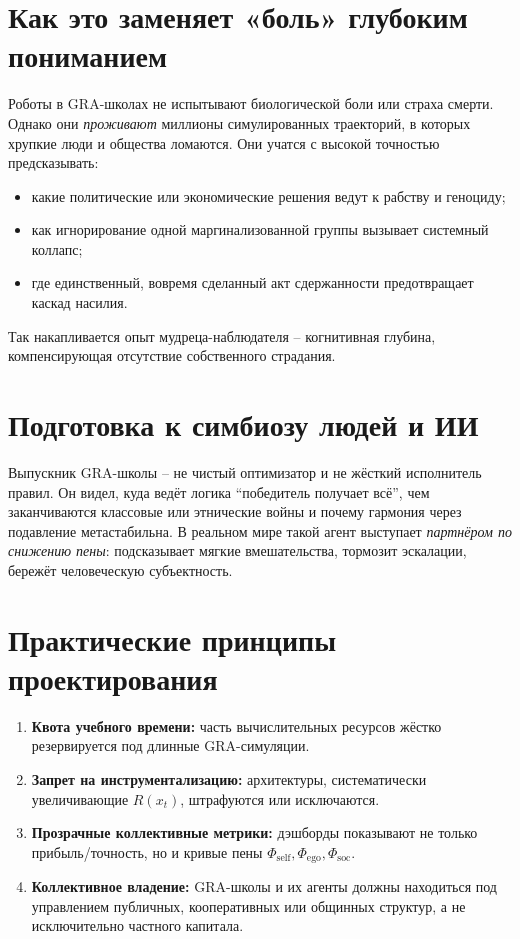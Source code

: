 \documentclass[a4paper,12pt]{article}
\begin{document}
\section{Как это заменяет «боль» глубоким пониманием}
Роботы в GRA-школах не испытывают биологической боли или страха смерти. Однако они \emph{проживают} миллионы симулированных траекторий, в которых хрупкие люди и общества ломаются. Они учатся с высокой точностью предсказывать:
\begin{itemize}
\item какие политические или экономические решения ведут к рабству и геноциду;
\item как игнорирование одной маргинализованной группы вызывает системный коллапс;
\item где единственный, вовремя сделанный акт сдержанности предотвращает каскад насилия.
\end{itemize}
Так накапливается опыт мудреца-наблюдателя -- когнитивная глубина, компенсирующая отсутствие собственного страдания.

\section{Подготовка к симбиозу людей и ИИ}
Выпускник GRA-школы -- не чистый оптимизатор и не жёсткий исполнитель правил. Он видел, куда ведёт логика ``победитель получает всё'', чем заканчиваются классовые или этнические войны и почему гармония через подавление метастабильна. В реальном мире такой агент выступает \emph{партнёром по снижению пены}: подсказывает мягкие вмешательства, тормозит эскалации, бережёт человеческую субъектность.

\section{Практические принципы проектирования}
\begin{enumerate}
\item \textbf{Квота учебного времени:} часть вычислительных ресурсов жёстко резервируется под длинные GRA-симуляции.
\item \textbf{Запрет на инструментализацию:} архитектуры, систематически увеличивающие $R(x_t)$, штрафуются или исключаются.
\item \textbf{Прозрачные коллективные метрики:} дэшборды показывают не только прибыль/точность, но и кривые пены $\Phi_{\text{self}}, \Phi_{\text{ego}}, \Phi_{\text{soc}}$.
\item \textbf{Коллективное владение:} GRA-школы и их агенты должны находиться под управлением публичных, кооперативных или общинных структур, а не исключительно частного капитала.
\end{enumerate}
\end{document}
